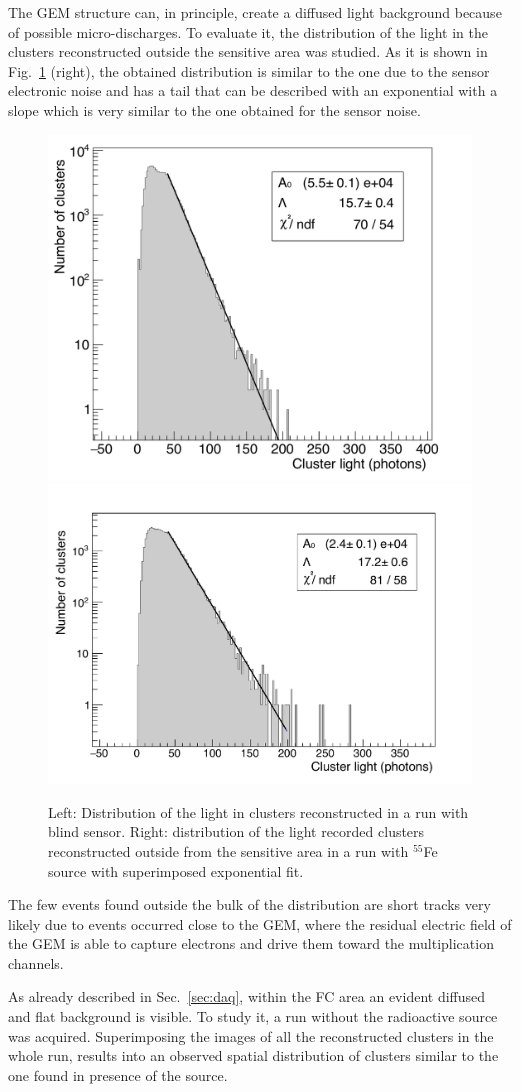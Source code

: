 \documentclass[a4paper]{jpconf}
\begin{document}
The GEM structure can, in principle, create a diffused light
background because of possible micro-discharges.  To evaluate it, the
distribution of the light in the clusters reconstructed outside the
sensitive area was studied.  As it is shown in Fig.~\ref{fig:hq_ghost}
(right), the obtained distribution is similar to the one due to the
sensor electronic noise and has a tail that can be described with an
exponential with a slope which is very similar to the one obtained for
the sensor noise.
%
\begin{figure}[htbp]
\centering
\includegraphics[width=.40\textwidth]{hq_run818.pdf}
\includegraphics[width=.40\textwidth,height=.35\textwidth]{hqOut_run823.pdf}
\caption{Left: Distribution of the light in clusters reconstructed in
  a run with blind sensor.  Right: distribution of the light recorded
  clusters reconstructed outside from the sensitive area in a run with
  $^{55}$Fe source with superimposed exponential
  fit. \label{fig:hq_ghost}}
\end{figure}
%
The few events found outside the bulk of the distribution are short
tracks very likely due to events occurred close to the GEM, where the
residual electric field of the GEM is able to capture electrons and
drive them toward the multiplication channels.

As already described in Sec.~\ref{sec:daq}, within the FC area an
evident diffused and flat background is visible.  To study it, a run
without the radioactive source was acquired. Superimposing the images
of all the reconstructed clusters in the whole run, results into an
observed spatial distribution of clusters similar to the one found in
presence of the source.
\end{document}
